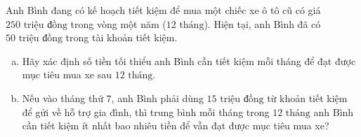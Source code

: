 \begin{bt}%
Anh Bình đang có kế hoạch tiết kiệm để mua một chiếc xe ô tô cũ có giá $250\text{ triệu đồng}$ trong vòng một năm ($12\text{ tháng}$). Hiện tại, anh Bình đã có $50\text{ triệu đồng}$ trong tài khoản tiết kiệm.
\begin{enumerate}[a)]
	\item Hãy xác định số tiền tối thiểu anh Bình cần tiết kiệm mỗi tháng để đạt được mục tiêu mua xe sau $12\text{ tháng}$.
	\item Nếu vào tháng thứ $7$, anh Bình phải dùng $15\text{ triệu đồng}$ từ khoản tiết kiệm để gửi về hỗ trợ gia đình, thì trung bình mỗi tháng trong $12\text{ tháng}$ anh Bình cần tiết kiệm ít nhất bao nhiêu tiền để vẫn đạt được mục tiêu mua xe?
\end{enumerate}
\end{bt}

